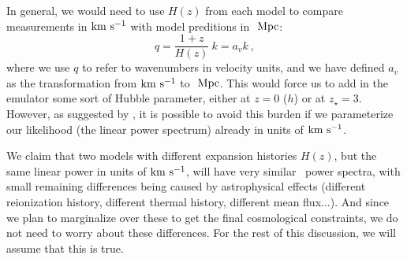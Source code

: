 In general, we would need to use $H(z)$ from each model to compare 
measurements in ${\rm km~s^{-1}}$ with model preditions in $\ \text{Mpc}$:
\begin{equation}
 q = \frac{1+z}{H(z)} ~ k = a_v k~,
\end{equation}
where we use $q$ to refer to wavenumbers in velocity units, and we have 
defined $a_v$ as the transformation from ${\rm km~s^{-1}}$ to $\ \text{Mpc}$.
This would force us to add in the emulator some sort of Hubble 
parameter, either at $z=0$ ($h$) or at $z_\star=3$. 
However, as suggested by \cite{McDonald2005a}, it is possible to avoid this
burden if we parameterize our likelihood (the linear power spectrum) already
in units of ${\rm km~s^{-1}}$. 


We claim that two models with different expansion histories $H(z)$, but the
same linear power in units of ${\rm km~s^{-1}}$, will have very similar \lya\ power
spectra, with small remaining differences being caused by astrophysical 
effects (different reionization history, different thermal history, different
mean flux...). 
And since we plan to marginalize over these to get the final cosmological 
constraints, we do not need to worry about these differences. 
For the rest of this discussion, we will assume that this is true.

